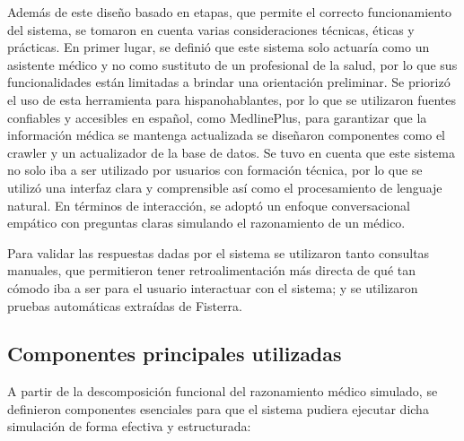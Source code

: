 \documentclass{llncs}
\begin{document}
Además de este diseño basado en etapas, que permite el correcto funcionamiento del sistema, se tomaron en cuenta varias consideraciones técnicas, éticas y prácticas. En primer lugar, se definió que este sistema solo actuaría como un
asistente médico y no como sustituto de un profesional de la salud, por lo que sus funcionalidades están limitadas a brindar una orientación preliminar. Se priorizó el uso de esta herramienta para hispanohablantes, por lo que se utilizaron
fuentes confiables y accesibles en español, como MedlinePlus\cite{medlineplus}, para garantizar que la información médica se mantenga actualizada se diseñaron componentes como el crawler y un actualizador de la base de datos. Se tuvo en cuenta
que este sistema no solo iba a ser utilizado por usuarios con formación técnica, por lo que se utilizó una interfaz clara y comprensible así como el procesamiento de lenguaje natural. En términos de interacción, se adoptó un enfoque conversacional
empático con preguntas claras simulando el razonamiento de un médico.

Para validar las respuestas dadas por el sistema se utilizaron tanto consultas manuales, que permitieron tener retroalimentación más directa de qué tan cómodo iba a ser para el usuario interactuar con el sistema; y se utilizaron pruebas automáticas
extraídas de Fisterra\cite{fisterra}.

\subsection{Componentes principales utilizadas}

A partir de la descomposición funcional del razonamiento médico simulado, se definieron componentes esenciales para que el sistema pudiera ejecutar dicha simulación de forma efectiva y estructurada:
\end{document}
